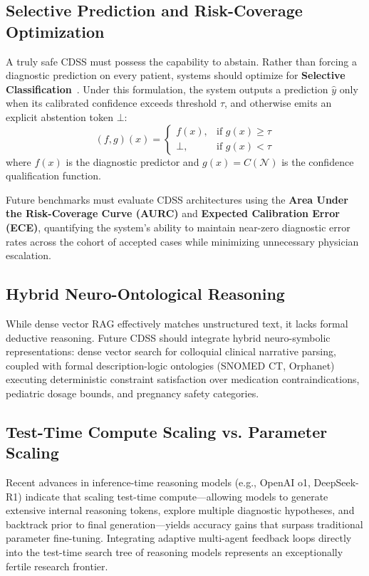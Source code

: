 \documentclass[conference]{IEEEtran}
\begin{document}
\subsection{Selective Prediction and Risk-Coverage Optimization}
A truly safe CDSS must possess the capability to abstain. Rather than forcing a diagnostic prediction on every patient, systems should optimize for \textbf{Selective Classification}~\cite{geifman2017selective}. Under this formulation, the system outputs a prediction $\hat{y}$ only when its calibrated confidence exceeds threshold $\tau$, and otherwise emits an explicit abstention token $\bot$:
\begin{equation}
(f, g)(x) = 
\begin{cases}
f(x), & \text{if } g(x) \ge \tau \\
\bot, & \text{if } g(x) < \tau
\end{cases}
\end{equation}
where $f(x)$ is the diagnostic predictor and $g(x) = C(\mathcal{N})$ is the confidence qualification function.

Future benchmarks must evaluate CDSS architectures using the \textbf{Area Under the Risk-Coverage Curve (AURC)} and \textbf{Expected Calibration Error (ECE)}, quantifying the system's ability to maintain near-zero diagnostic error rates across the cohort of accepted cases while minimizing unnecessary physician escalation.

\subsection{Hybrid Neuro-Ontological Reasoning}
While dense vector RAG effectively matches unstructured text, it lacks formal deductive reasoning. Future CDSS should integrate hybrid neuro-symbolic representations: dense vector search for colloquial clinical narrative parsing, coupled with formal description-logic ontologies (SNOMED CT, Orphanet) executing deterministic constraint satisfaction over medication contraindications, pediatric dosage bounds, and pregnancy safety categories.

\subsection{Test-Time Compute Scaling vs. Parameter Scaling}
Recent advances in inference-time reasoning models (e.g., OpenAI o1, DeepSeek-R1) indicate that scaling test-time compute---allowing models to generate extensive internal reasoning tokens, explore multiple diagnostic hypotheses, and backtrack prior to final generation---yields accuracy gains that surpass traditional parameter fine-tuning. Integrating adaptive multi-agent feedback loops directly into the test-time search tree of reasoning models represents an exceptionally fertile research frontier.
\end{document}
